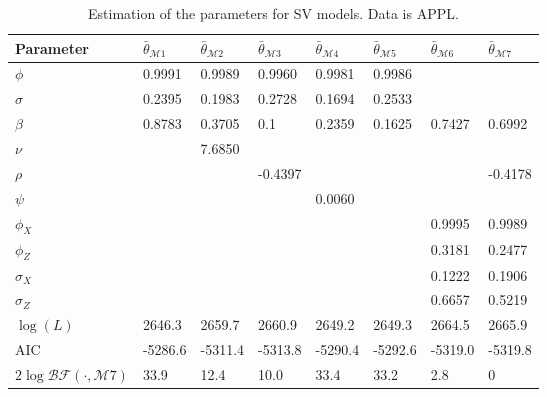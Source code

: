 \documentclass[11pt,a4,twosided,singlespacing,titlepagenumber=on]{scrreprt}
\numberwithin{equation}{chapter} %
\theoremstyle{remark}
\begin{document}
\newpage
\begin{table}[H]
\centering
\begin{tabular}{llllllll}
Parameter        & $\bar{\theta}_{\mathcal{M}1}$ & $\bar{\theta}_{\mathcal{M}2}$ & $\bar{\theta}_{\mathcal{M}3}$ & $\bar{\theta}_{\mathcal{M}4}$ & $\bar{\theta}_{\mathcal{M}5}$ & $\bar{\theta}_{\mathcal{M}6}$ & $\bar{\theta}_{\mathcal{M}7}$\\ 
\hline
$\phi$								                  & 0.9991  & 0.9989 & 0.9960  & 0.9981 & 0.9986 & \\
$\sigma$                                & 0.2395  & 0.1983 & 0.2728  & 0.1694 & 0.2533 & \\
$\beta$                                 & 0.8783  & 0.3705 & 0.1     & 0.2359 & 0.1625 & 0.7427 & 0.6992\\
$\nu$                                   &         & 7.6850 &         & & &\\
$\rho$                                  &         &        & -0.4397 & & & & -0.4178\\
$\psi$                                  &         &        &         & 0.0060 & & \\
$\phi_X$                                &         &        &         & & & 0.9995 & 0.9989\\
$\phi_Z$                                &         &        &         & & & 0.3181 & 0.2477\\
$\sigma_X$                              &         &        &         & & & 0.1222 & 0.1906\\
$\sigma_Z$                              &         &        &         & & & 0.6657 & 0.5219\\
$\log(L)$                               & 2646.3  & 2659.7 & 2660.9  & 2649.2 & 2649.3 & 2664.5 & 2665.9\\
AIC                                     & -5286.6 & -5311.4 & -5313.8 & -5290.4 & -5292.6 & -5319.0 & -5319.8\\
$2 \log \mathcal{BF}(\cdot, \mathcal{M}7)$& 33.9  & 12.4    & 10.0     & 33.4  & 33.2 & 2.8 & 0\\
\hline
\end{tabular}
\caption{Estimation of the parameters for SV models. Data is APPL.}
\label{estimation_of_sv_appl}
\end{table}
\end{document}
